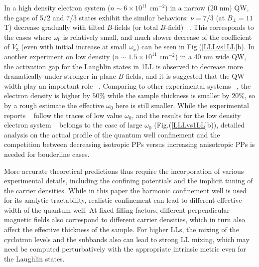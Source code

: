 \documentclass[twocolumn,showpacs,amsmath,amstex,amssymb,mathfonts,prb]{revtex4-1}
\begin{document}
In a high density electron system ($n \sim 6 \times 10^{11}$ cm$^{-2}$) in a narrow (20 nm) QW, the gaps of 5/2 and 7/3 states exhibit the similar behaviors: $\nu = 7/3$ (at $B_{\perp}=11$ T) decrease gradually with tilted $B$-fields (or total $B$-field) ~\cite{chi10}. This corresponds to the cases where $\omega_0$ is relatively small, and much slower decrease of the coefficient of $V_3$ (even with initial increase at small $\omega_x$) can be seen in Fig.(\ref{LLLvs1LL}b). In another experiment on low density ($n \sim 1.5 \times 10^{11}$ cm$^{-2}$) in a 40 nm wide QW, the activation gap for the Laughlin states in 1LL is observed to decrease more dramatically under stronger in-plane $B$-fields, and it is suggested that the QW width play an important role ~\cite{dean08}. Comparing to other experimental systems ~\cite{chi12}, the electron density is higher by $50\%$ while the sample thickness is smaller by $20\%$, so by a rough estimate the effective $\omega_0$ here\cite{dean08} is still smaller.
While the experimental reports ~\cite{chi10} follow the traces of low value $\omega_{0}$, and the results for the low density electron system ~\cite{chi12} belongs to the case of large $\omega_{0}$ (Fig.(\ref{LLLvs1LL}b)), detailed analysis on the actual profile of the quantum well confinement and the competition between decreasing isotropic PPs versus increasing anisotropic PPs is needed for bouderline cases\cite{dean08}.

More accurate theoretical predictions thus require the incorporation of various experimental details, including the confining potentials and the implicit tuning of the carrier densities. While in this paper the harmonic confinement well is used for its analytic tractability, realistic confinement can lead to different effective width of the quantum well. At fixed filling factors, different perpendicular magnetic fields also correspond to different carrier densities, which in turn also affect the effective thickness of the sample. For higher LLs, the mixing of the cyclotron levels and the subbands also can lead to strong LL mixing, which may need be computed perturbatively with the appropriate intrinsic metric even for the Laughlin states.
\end{document}

